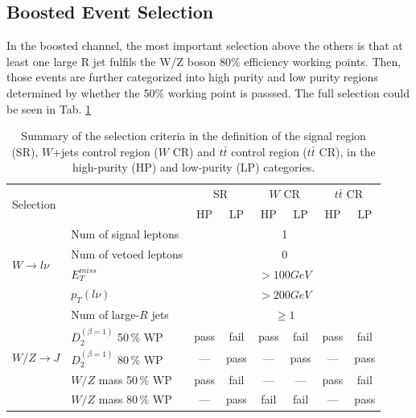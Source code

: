\subsection{Boosted Event Selection}
In the boosted channel, the most important selection above the others is that at least one large R jet fulfils the W/Z boson $80\%$ efficiency working points. Then, those events are further categorized into high purity and low purity regions determined by whether the 50$\%$ working point is passsed. The full selection could be seen in Tab. \ref{tab:SRdefinitions}

\begin{table}[t]
	\caption{Summary of the selection criteria in the definition of the signal region (SR), $W$+jets control region ($W$ CR) and $t\bar{t}$ control region ($t\bar{t}$ CR), in the high-purity (HP) and low-purity (LP) categories.  } \label{tab:SRdefinitions}
	\begin{center}
		\begin{adjustbox}{center}
		\begin{tabular}{|l|l|c|c|c|c|c|c|}
			\hline
			\multicolumn{2}{|l|}{\multirow{2}{*}{Selection}} & \multicolumn{2}{c|}{SR}  &  \multicolumn{2}{c|}{$W$ CR}  & \multicolumn{2}{c|}{$t\bar{t}$ CR} \\
			\cline{3-8}
			\multicolumn{2}{|l|}{} & HP & LP &HP & LP & HP & LP \\
			\hline
			\multirow{4}{*}{$W\rightarrow l\nu$} & Num of signal leptons & \multicolumn{6}{c|}{ 1 } \\
			\cline{2-8}
			&Num of vetoed leptons & \multicolumn{6}{c|}{ 0 }  \\
			\cline{2-8}
			&\vphantom{\Large B} $E^{miss}_{T}$ & \multicolumn{6}{c|}{ $>100GeV$ } \\
			\cline{2-8}
			&$p_{T}(l\nu)$ & \multicolumn{6}{c|}{ $>200GeV$ } \\
			\hline
			\multirow{5}{*}{$W/Z\rightarrow J$} & Num of large-$R$ jets & \multicolumn{6}{c|}{ $\geq 1$ } \\
			\cline{2-8}
			& \vphantom{\Large B} $D^{(\beta=1)}_2$ 50\,\% WP & pass & fail & pass & fail & pass & fail \\
			\cline{2-8}
			& \vphantom{\Large B} $D^{(\beta=1)}_2$ 80\,\% WP & --- & pass  & --- & pass  & --- & pass \\
			\cline{2-8}
			& $W/Z$ mass 50\,\% WP & pass &fail& --- & --- & pass & fail\\
			\cline{2-8}
			& $W/Z$ mass 80\,\% WP &  --- & pass & fail & fail & --- & pass\\

\end{tabular}
\end{adjustbox}
\end{center}
\end{table}
